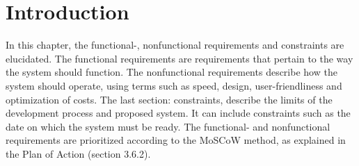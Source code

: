 \section{Introduction}
In this chapter, the functional-, nonfunctional requirements and constraints are elucidated. The functional requirements are requirements that pertain to the way the system should function. The nonfunctional requirements describe how the system should operate, using terms such as speed, design, user-friendliness and optimization of costs. The last section: constraints, describe the limits of the development process and proposed system. It can include constraints such as the date on which the system must be ready. The functional- and nonfunctional requirements are prioritized according to the MoSCoW method, as explained in the Plan of Action (section 3.6.2).